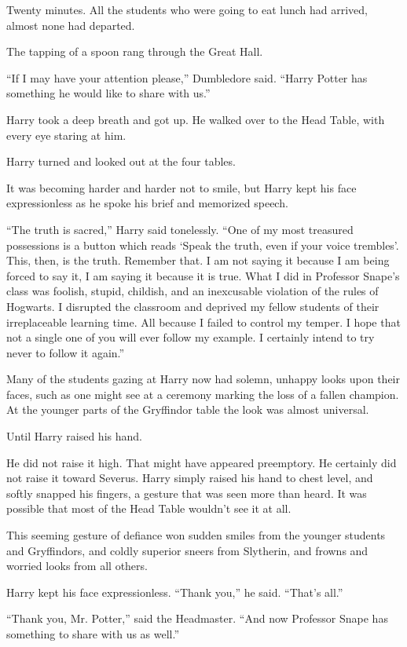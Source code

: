 Twenty minutes. All the students who were going to eat lunch had
arrived, almost none had departed.

The tapping of a spoon rang through the Great Hall.

``If I may have your attention please,'' Dumbledore said. ``Harry Potter
has something he would like to share with us.''

Harry took a deep breath and got up. He walked over to the Head Table,
with every eye staring at him.

Harry turned and looked out at the four tables.

It was becoming harder and harder not to smile, but Harry kept his face
expressionless as he spoke his brief and memorized speech.

``The truth is sacred,'' Harry said tonelessly. ``One of my most
treasured possessions is a button which reads `Speak the truth, even if
your voice trembles'. This, then, is the truth. Remember that. I am not
saying it because I am being forced to say it, I am saying it because it
is true. What I did in Professor Snape's class was foolish, stupid,
childish, and an inexcusable violation of the rules of Hogwarts. I
disrupted the classroom and deprived my fellow students of their
irreplaceable learning time. All because I failed to control my temper.
I hope that not a single one of you will ever follow my example. I
certainly intend to try never to follow it again.''

Many of the students gazing at Harry now had solemn, unhappy looks upon
their faces, such as one might see at a ceremony marking the loss of a
fallen champion. At the younger parts of the Gryffindor table the look
was almost universal.

Until Harry raised his hand.

He did not raise it high. That might have appeared preemptory. He
certainly did not raise it toward Severus. Harry simply raised his hand
to chest level, and softly snapped his fingers, a gesture that was seen
more than heard. It was possible that most of the Head Table wouldn't
see it at all.

This seeming gesture of defiance won sudden smiles from the younger
students and Gryffindors, and coldly superior sneers from Slytherin, and
frowns and worried looks from all others.

Harry kept his face expressionless. ``Thank you,'' he said. ``That's
all.''

``Thank you, Mr. Potter,'' said the Headmaster. ``And now Professor
Snape has something to share with us as well.''

